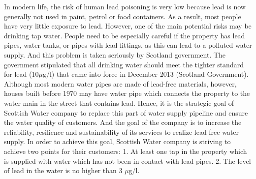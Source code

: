 \documentclass[11pt,twoside]{article}
\numberwithin{Theorem}{section}
\numberwithin{Definition}{section}
\numberwithin{Lemma}{section}
\numberwithin{Algorithm}{section}
\numberwithin{equation}{section}
\begin{document}
In modern life, the risk of human lead poisoning is very low because lead is now generally not used in paint, petrol or food containers. As a result, most people have very little exposure to lead. However, one of the main potential risks may be drinking tap water. People need to be especially careful if the property has lead pipes, water tanks, or pipes with lead fittings, as this can lead to a polluted water supply. And this problem is taken seriously by Scotland government. The government stipulated that all drinking water should meet the tighter standard for lead (10$\mu$g/l) that came into force in December 2013 (Scotland Government).  Although most modern water pipes are made of lead-free materials, however, houses built before 1970 may have water pipe which connects the property to the water main in the street that contains lead. Hence, it is the strategic goal of Scottish Water company to replace this part of water supply pipeline and ensure the water quality of customers. And the goal of the company is to increase the reliability, resilience and sustainability of its services to realize lead free water supply. In order to achieve this goal, Scottish Water company is striving to achieve two points for their customers: 1. At least one tap in the property which is supplied with water which has not been in contact with lead pipes. 2. The level of lead in the water is no higher than 3 $\mu$g/l.

\clearpage
\end{document}
